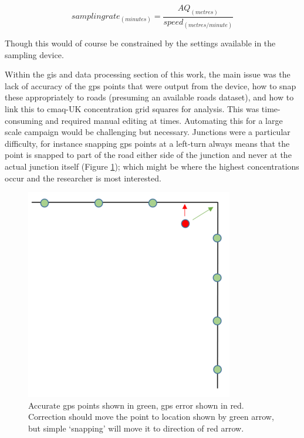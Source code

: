 \begin{equation}
  sampling rate_{(minutes)} = \frac{AQ_{(metres)}}{speed_{(metres/minute)}}
  \label{eq:sampling_rate_equation}
\end{equation}

Though this would of course be constrained by the settings available in the sampling device.

Within the \gls{gis} and data processing section of this work, the main issue was the lack of accuracy of the \gls{gps} points that were output from the device, how to snap these appropriately to roads (presuming an available roads dataset), and how to link this to \gls{cmaq}-UK concentration grid squares for analysis. This was time-consuming and required manual editing at times. Automating this for a large scale campaign would be challenging but necessary. Junctions were a particular difficulty, for instance snapping \gls{gps} points at a left-turn always means that the point is snapped to part of the road either side of the junction and never at the actual junction itself (Figure \ref{fig:gps_snapping_error}); which might be where the highest concentrations occur and the researcher is most interested.

\begin{figure}[H]
\centering
\includegraphics[scale=0.7]{images/gps_snapping_error.png}
\caption{Accurate \gls{gps} points shown in green, \gls{gps} error shown in red. Correction should move the point to location shown by green arrow, but simple ‘snapping’ will move it to direction of red arrow.}
\label{fig:gps_snapping_error}
\end{figure}

